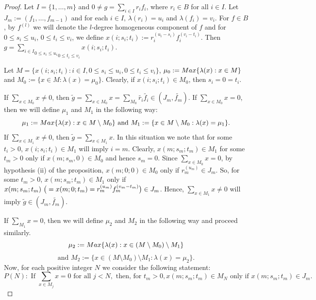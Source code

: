 \documentclass[a4paper,12pt]{article}
\begin{document}
{\begin{proof}
\medskip\noindent
Let $I=\{1,\dots,m\}$ and $0\neq g={\underset{i\in I}\sum}r_if_i$, where $r_i\in B$ for all $i\in I$. Let $J_m:=(f_1,\dots,f_{m-1})$ and for each $i\in I$, $\lambda(r_i)=u_i$ and $\lambda(f_i)=v_i$. For $f\in B$, by $f^{(l)}$ we will denote the $l$-degree homogeneous component of $f$ and for $0\leqslant s_i\leqslant u_i$, $0\leqslant t_i\leqslant v_i$, we define $x(i;s_i;t_i):=r_i^{(u_i-s_i)}f_i^{(v_i-t_i)}$. Then $g={\underset{0\leqslant t_i\leqslant v_i}{\underset{0\leqslant s_i\leqslant u_i}{\underset{i\in I}\sum}}}x(i;s_i;t_i).$

\smallskip\noindent Let $M=\{x(i;s_i;t_i):i\in I,0\leqslant s_i\leqslant u_i,0\leqslant t_i\leqslant v_i\}$, $\mu_0:={\rm Max}\{\lambda(x):x\in M \}$ and $M_0:=\{x\in M:\lambda(x)=\mu_0\}$. Clearly, if $x(i;s_i;t_i)\in M_0$, then $s_i=0=t_i$. 

\smallskip\noindent If ${\underset{x\in{M_0}}\sum}x\neq 0$, then $\widetilde {g}={\underset{x\in{M_0}}\sum}x={\underset{M_0}\sum}\widetilde{r_i}\widetilde{f_i}\in (J_m,\widetilde{f_m}).$ If ${\underset{x\in{M_0}}\sum}x=0$, then we will define $\mu_1$ and $M_1$ in the following way:
$$\mu_1:={\rm Max}\{\lambda(x):x\in M\setminus M_0 \} \text{ and }M_1:=\{x\in M\setminus M_0:\lambda(x)=\mu_1\}.$$ %
If ${\underset{x\in{M_1}}\sum}x\neq 0$, then $\widetilde {g}={\underset{x\in{M_1}}\sum}x$. In this situation we note that  for some $t_i>0$, $x(i;s_i;t_i)\in M_1$ will imply $i=m$. Clearly, $x(m;s_m;t_m)\in M_1$ for some $t_m>0$ only if $x(m;s_m,0)\in M_0$ and hence $s_m=0$. Since ${\underset{x\in{M_0}}\sum}x= 0$, by hypothesis (ii) of the proposition, $x(m;0;0)\in M_0$ only if $r_m^{(u_m)}\in J_m$. So, for some $t_m>0$, $x(m;s_m;t_m)\in M_1$ only if $x(m;s_m;t_m)~\big{(}=x(m;0;t_m)=r_m^{(u_m)}f_m^{(v_m-t_m)}\big{)}\in J_m$. Hence, ${\underset{x\in{M_1}}\sum}x\neq 0$ will imply $\widetilde{g}\in (J_m,\widetilde{f_m})$.

\medskip\noindent
If ${\underset{M_1}\sum}x=0$, then we will define $\mu_2$ and $M_2$ in the following way and proceed similarly.
$$\mu_2:={\rm Max}\{\lambda(x):x\in (M\setminus M_0)\setminus M_1 \}$$ $$\text{and }M_2:=\{x\in (M\setminus M_0)\setminus M_1:\lambda(x)=\mu_2\}.$$ 
Now, for each positive integer $N$ we consider the following statement:
$$P(N):\text{ If }{\underset{x\in M_j}\sum}x=0 \text{ for all } j<N, \text{ then, for }t_m>0, x(m;s_m;t_m)\in M_N\text{ only if }x(m;s_m;t_m)\in J_m.$$


\end{proof}}
\end{document}
